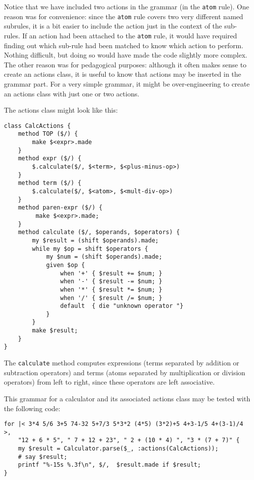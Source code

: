 Notice that we have included two actions in the grammar (in 
the {\tt atom} rule). One reason was for convenience: since 
the {\tt atom} rule covers two very different named 
subrules, it is a bit easier to include the action just 
in the context of the sub-rules. If an action had been attached 
to the  {\tt atom} rule, it would have required finding out 
which sub-rule had been matched to know which action to 
perform. Nothing difficult, but doing so would have made the  
code slightly more complex. The other reason was for pedagogical 
purposes: although it often makes sense to create an actions 
class, it is useful to know that actions may be inserted in the 
grammar part. For a very simple grammar, it might be 
over-engineering to create an actions class with just one or 
two actions.

The actions class might look like this:

\begin{verbatim}
class CalcActions {
    method TOP ($/) {
        make $<expr>.made
    }
    method expr ($/) {
        $.calculate($/, $<term>, $<plus-minus-op>)
    }
    method term ($/) {
        $.calculate($/, $<atom>, $<mult-div-op>)
    }
    method paren-expr ($/) {
         make $<expr>.made;
    }
    method calculate ($/, $operands, $operators) {
        my $result = (shift $operands).made;
        while my $op = shift $operators {
            my $num = (shift $operands).made;
            given $op {
                when '+' { $result += $num; }
                when '-' { $result -= $num; }
                when '*' { $result *= $num; }
                when '/' { $result /= $num; }
                default  { die "unknown operator "}
            }
        }
        make $result;
    }
}
\end{verbatim}

The {\tt calculate} method computes expressions (terms 
separated by addition or subtraction operators) and terms 
(atoms separated by multiplication or division operators) 
from left to right, since these operators are left associative.

This grammar for a calculator and its associated actions class 
may be tested with the following code:

\begin{verbatim}
for |< 3*4 5/6 3+5 74-32 5+7/3 5*3*2 (4*5) (3*2)+5 4+3-1/5 4+(3-1)/4 >,
    "12 + 6 * 5", " 7 + 12 + 23", " 2 + (10 * 4) ", "3 * (7 + 7)" { 
    my $result = Calculator.parse($_, :actions(CalcActions));
    # say $result;
    printf "%-15s %.3f\n", $/,  $result.made if $result;
}
\end{verbatim}

